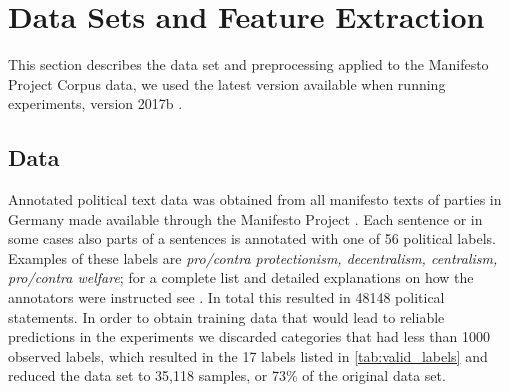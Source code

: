\documentclass[runningheads,a4paper]{article}
\begin{document}
\section{Data Sets and Feature Extraction}\label{sec:data}
%
This section describes the data set and preprocessing applied to the Manifesto Project Corpus data, we used the latest version available when running experiments, version 2017b \cite{manifesto}. 
\subsection{Data}
Annotated political text data was obtained from all manifesto texts of parties in Germany made available through the Manifesto Project \cite{manifesto}. 
Each sentence or in some cases also parts of a sentences is annotated with one of 56 political labels. Examples of these labels are {\em pro/contra protectionism, decentralism, centralism, pro/contra welfare}; for a complete list and detailed explanations on how the annotators were instructed see \cite{leftright}. In total this resulted in 48148 political statements. In order to obtain training data that would lead to reliable predictions in the experiments we discarded categories that had less than 1000 observed labels, which resulted in the 17 labels listed in \autoref{tab:valid_labels} and reduced the data set to 35,118 samples, or 73\% of the original data set.
\end{document}
